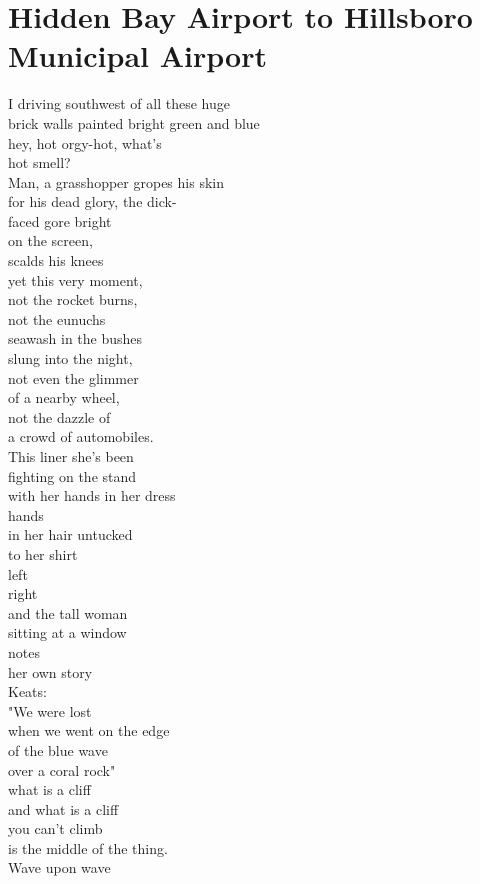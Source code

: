 \documentclass[smalldemyvopaper,11pt,twoside,onecolumn,openright,extrafontsizes]{memoir}
\begin{document}
\chapter{Hidden Bay Airport to Hillsboro Municipal Airport}
I driving southwest of all these huge
\\brick walls painted bright green and blue
\\hey, hot orgy-hot, what's
\\hot smell?
\\Man, a grasshopper gropes his skin
\\for his dead glory, the dick-
\\faced gore bright
\\on the screen,
\\scalds his knees
\\yet this very moment,
\\not the rocket burns,
\\not the eunuchs
\\seawash in the bushes
\\slung into the night,
\\not even the glimmer
\\of a nearby wheel,
\\not the dazzle of
\\a crowd of automobiles.
\\This liner she's been
\\fighting on the stand
\\with her hands in her dress
\\hands
\\in her hair untucked
\\to her shirt
\\left
\\right
\\and the tall woman
\\sitting at a window
\\notes
\\her own story
\\Keats:
\\"We were lost
\\when we went on the edge
\\of the blue wave
\\over a coral rock"
\\what is a cliff
\\and what is a cliff
\\you can't climb
\\is the middle of the thing.
\\Wave upon wave
\end{document}
